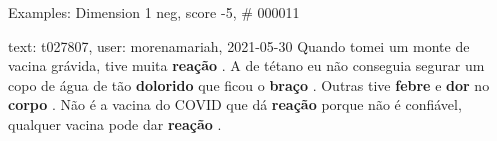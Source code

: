 \begin{frame}{Examples: Dimension 1 neg, score -5, \# 000011}
\footnotesize
\begin{alertblock}{text: t027807, user: morenamariah, 2021-05-30}
Quando tomei um monte de vacina grávida, tive muita \textbf{reação} . A de 
tétano eu não conseguia segurar um copo de água de tão \textbf{dolorido} que 
ficou o \textbf{braço} . Outras tive \textbf{febre} e \textbf{dor} no 
\textbf{corpo} . Não é a vacina do COVID que dá \textbf{reação} porque não é 
confiável, qualquer vacina pode dar \textbf{reação} . 
\end{alertblock}
\end{frame}
